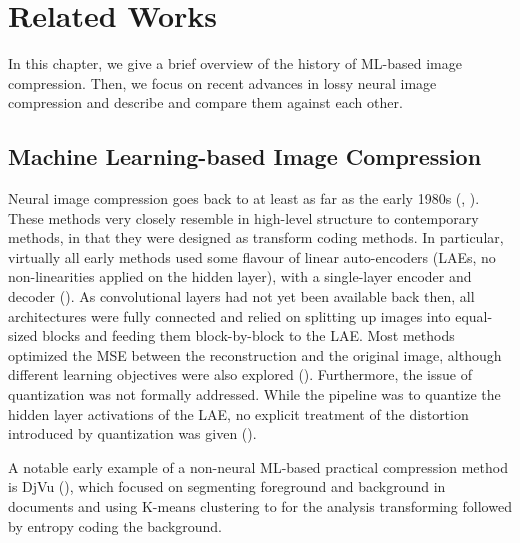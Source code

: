 
\chapter{Related Works}
\label{chapter:related_works}

\graphicspath{{../img/related_works/}}

\par
In this chapter, we give a brief overview of the history of ML-based image
compression. Then, we focus on recent advances in lossy neural image compression
and describe and compare them against each other.

\section{Machine Learning-based Image Compression}
\par
Neural image compression goes back to at least as far as the early 1980s
(\cite{mougeot1991image}, \cite{jiang1999image}). These methods very closely
resemble in high-level structure to contemporary methods, in that they were
designed as transform coding methods. In particular, virtually all early methods
used some flavour of linear auto-encoders (LAEs, no non-linearities applied on
the hidden layer), with a single-layer encoder and
decoder (\cite{jiang1999image}). As convolutional layers had not yet been
available back then, all architectures were fully connected
and relied on splitting up images into equal-sized blocks and feeding them
block-by-block to the LAE. Most methods optimized the MSE between the
reconstruction and the original image, although different learning objectives
were also explored (\cite{mougeot1991image}). Furthermore, the issue of
quantization was not formally addressed. While the pipeline was to quantize the hidden
layer activations of the LAE, no explicit treatment of the distortion introduced
by quantization was given (\cite{jiang1999image}).

\par
A notable early example of a non-neural ML-based practical compression method
is DjVu (\cite{bottou1998high}), which focused on segmenting foreground and
background in documents and using K-means clustering to for the analysis
transforming followed by entropy coding the background.

